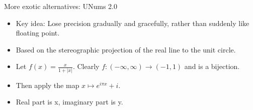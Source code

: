 \documentclass{beamer}
\begin{document}
\begin{frame}{More exotic alternatives: UNums 2.0}
\begin{itemize}
\item Key idea: Lose precision gradually and gracefully, rather than suddenly like floating point.
\item Based on the stereographic projection of the real line to the unit circle. 
\item Let $f(x) = \frac{x}{1 + |x|}$. Clearly $f: (-\infty, \infty) \to (-1, 1)$ and is a bijection.
\item Then apply the map $x \mapsto e^{i \pi x} + i$.

\begin{minipage}{\textwidth}\centering
{}
\end{minipage}

\item Real part is x, imaginary part is y.
\end{itemize}
\end{frame}
\end{document}
